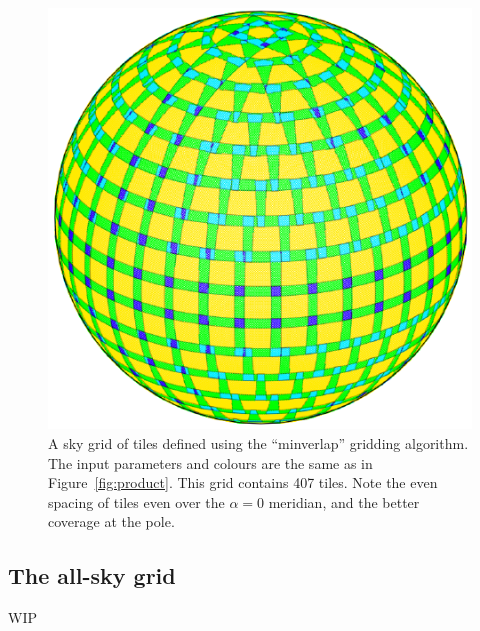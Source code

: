 \begin{colsection}
\begin{colsection}
\begin{figure}[p]
\begin{minipage}[c]{0.46\textwidth}
\includegraphics[width=\linewidth]{images/algo_minverlap.pdf}
\end{minipage}
\hfill
\begin{minipage}[c]{0.50\textwidth}
\caption[The ``minverlap'' gridding algorithm]{A sky grid of tiles defined using the ``minverlap'' gridding algorithm. The input parameters and colours are the same as in Figure~\ref{fig:product}. This grid contains 407 tiles.  Note the even spacing of tiles even over the $\alpha=0$ meridian, and the better coverage at the pole.}
\label{fig:minverlap}
\end{minipage}
\end{figure}




\end{colsection}


\subsection{The all-sky grid}
\label{sec:survey}
\begin{colsection}

WIP


\end{colsection}
\end{colsection}
